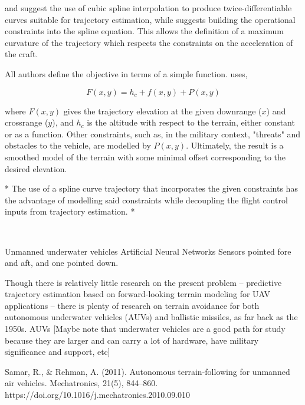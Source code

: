 \cite{MENON1991} and \cite{Funk1977} suggest the use of cubic spline interpolation to produce twice-differentiable curves suitable for trajectory estimation, while \cite{Funk1977} suggests building the operational constraints into the spline equation. This allows the definition of a maximum curvature of the trajectory which respects the constraints on the acceleration of the craft.

All authors define the objective in terms of a simple function. \cite{MENON1991} uses, 

\begin{equation}
F(x,y) = h_c + f(x,y) + P(x,y)
\end{equation}

where $F(x,y)$ gives the trajectory elevation at the given downrange ($x$) and crossrange ($y$), and $h_c$ is the altitude with respect to the terrain, either constant or as a function. Other constraints, such as, in the military context, "threats" and obstacles to the vehicle, are modelled by $P(x,y)$. Ultimately, the result is a smoothed model of the terrain with some minimal offset corresponding to the desired elevation.

* The use of a spline curve trajectory that incorporates the given constraints has the advantage of modelling said constraints while decoupling the flight control inputs from trajectory estimation. *


~~~

Unmanned underwater vehicles
Artificial Neural Networks
Sensors pointed fore and aft, and one pointed down.

Though there is relatively little research on the present problem -- predictive trajectory estimation based on forward-looking terrain modeling for UAV applications -- there is plenty of research on terrain avoidance for both autonomous underwater vehicles (AUVs) and ballistic missiles, as far back as the 1950s. 
AUVs
[Maybe note that underwater vehicles are a good path for study because they are larger and can carry a lot of hardware, have military significance and support, etc]

\cite{Samar2011}
Samar, R., \& Rehman, A. (2011). Autonomous terrain-following for unmanned air vehicles. Mechatronics, 21(5), 844–860. https://doi.org/10.1016/j.mechatronics.2010.09.010

